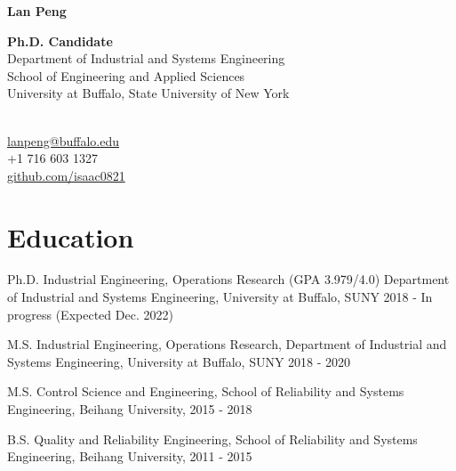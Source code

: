 \documentclass[12pt,letterpaper]{report}
\newcommand{\myname}{Lan Peng}
\newcommand{\namefont}[1]{{\normalfont\bfseries\Huge{#1}}}
\begin{document}
    \raggedright{}

    \namefont{\myname}

    \vspace{1em}
    \begin{minipage}[t]{0.700\textwidth}
        \textbf{Ph.D. Candidate} \\
        Department of Industrial and Systems Engineering \\
        School of Engineering and Applied Sciences \\
        University at Buffalo, State University of New York
    \end{minipage}
    \begin{minipage}[t]{0.295\textwidth}
        \flushright{}
        \quad\\
        \href{lanpeng@buffalo.edu}{lanpeng@buffalo.edu} \\
        +1 716 603 1327 \\
        \href{https://github.com/isaac0821}{github.com/isaac0821}
    \end{minipage}


    \section*{Education}
    \begin{tablist}
        \item[Ph.D.]  \tab{}Industrial Engineering, Operations Research (GPA 3.979/4.0) \tab{}Department of Industrial and Systems Engineering, University at Buffalo, SUNY \tab{}2018 - In progress (Expected Dec. 2022)
        \item[M.S.]  \tab{}Industrial Engineering, Operations Research, \tab{}Department of Industrial and Systems Engineering, University at Buffalo, SUNY \tab{}2018 - 2020
        \item[M.S.]  \tab{}Control Science and Engineering, \tab{}School of Reliability and Systems Engineering, Beihang University, \tab{}2015 - 2018
        \item[B.S.]  \tab{}Quality and Reliability Engineering, \tab{}School of Reliability and Systems Engineering, Beihang University, \tab{}2011 - 2015
    \end{tablist}
\end{document}
